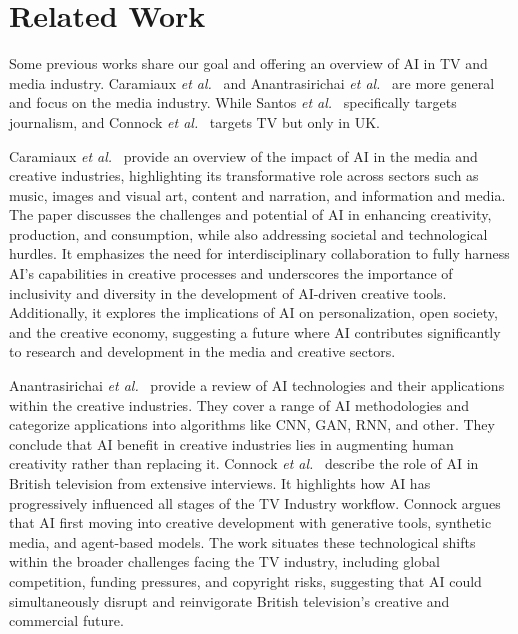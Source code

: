 \documentclass[sigconf,authorversion,review,authordraft]{webmedia}
\newcommand{\etal}[0]{\textit{et al.}~}
\begin{document}
\section{Related Work}
\label{sec:related-work}

Some previous works share our goal and offering an overview of AI in TV and media industry. Caramiaux \etal\cite{amato2019ai} and Anantrasirichai \etal\cite{anantrasirichai2022artificial} are more general and focus on the media industry. While Santos \etal\cite{journalmedia3010002} specifically targets journalism, and Connock \etal\cite{connock2024} targets TV but only in UK.

Caramiaux \etal\cite{amato2019ai} provide an overview of the impact of \ac{AI} in the media and creative industries, highlighting its transformative role across sectors such as music, images and visual art, content and narration, and information and media. The paper discusses the challenges and potential of AI in enhancing creativity, production, and consumption, while also addressing societal and technological hurdles. It emphasizes the need for interdisciplinary collaboration to fully harness AI's capabilities in creative processes and underscores the importance of inclusivity and diversity in the development of AI-driven creative tools. Additionally, it explores the implications of AI on personalization, open society, and the creative economy, suggesting a future where AI contributes significantly to research and development in the media and creative sectors.

Anantrasirichai \etal\cite{anantrasirichai2022artificial} provide a review of \ac{AI} technologies and their applications within the creative industries. They cover a range of AI methodologies and categorize applications into algorithms like \ac{CNN}, \ac{GAN}, \ac{RNN}, and other. They conclude that AI benefit in creative industries lies in augmenting human creativity rather than replacing it. Connock \etal\cite{connock2024} describe the role of \ac{AI} in British television from extensive interviews. It highlights how AI has progressively influenced all stages of the TV Industry workflow. Connock argues that AI first moving into creative development with generative tools, synthetic media, and agent-based models. The work situates these technological shifts within the broader challenges facing the TV industry, including global competition, funding pressures, and copyright risks, suggesting that AI could simultaneously disrupt and reinvigorate British television's creative and commercial future.
\end{document}
